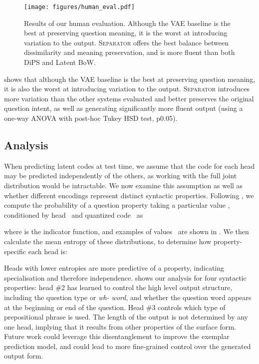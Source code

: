 \documentclass[11pt,a4paper]{article}
\begin{document}
\begin{figure}
    \centering
    \texttt{[image: figures/human\_eval.pdf]}
\caption{Results of our human evaluation. Although the VAE
      baseline is the best at preserving question meaning, it is the
      worst at introducing variation to the output. \textsc{Separator}
      offers the best balance between dissimilarity and meaning
      preservation, and is more fluent than both DiPS and Latent BoW.} 
    \label{fig:humaneval}
\end{figure}

 shows that although the VAE baseline is the best
at preserving question meaning, it is also the worst at introducing
variation to the output. \textsc{Separator} introduces more variation
than the other systems evaluated and better preserves the original
question intent, as well as generating significantly more fluent
output (using a one-way ANOVA with post-hoc Tukey HSD test,
\mbox{p0.05}).

\subsection{Analysis}




\label{sec:heads}



When predicting latent codes at test time, we assume that the code for
each head may be predicted independently of the others, as working
with the full joint distribution would be intractable. We now examine
this assumption as well as whether different encodings represent
distinct syntactic properties. Following
\citet{angelidis2020extractive}, we compute the probability of
a question property  taking a particular value , conditioned by head~ and
quantized code~ as

where  is the indicator function, and examples of values~ are shown in
. We then calculate the mean entropy of
these distributions, to determine how property-specific each head is:


Heads with lower entropies are more predictive of a property,
indicating specialisation and therefore
independence.  shows our analysis for four
syntactic properties: head \#2 has learned to control the high level
output structure, including the question type or \textit{wh- word},
and whether the question word appears at the beginning or end of the
question. Head \#3 controls which type of prepositional phrase is
used. The length of the output is not determined by any one head,
implying that it results from other properties of the surface form.
Future work could leverage this disentanglement to improve the exemplar prediction model, and could lead to more fine-grained control over the generated output form.
\end{document}
